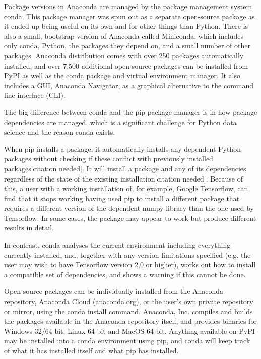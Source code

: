 \documentclass[oneside,a4paper,12pt]{report}
\begin{document}
Package versions in Anaconda are managed by the package management system conda. This package manager was spun out as a separate open-source package as it ended up being useful on its own and for other things than Python. There is also a small, bootstrap version of Anaconda called Miniconda, which includes only conda, Python, the packages they depend on, and a small number of other packages.
Anaconda distribution comes with over 250 packages automatically installed, and over 7,500 additional open-source packages can be installed from PyPI as well as the conda package and virtual environment manager. It also includes a GUI, Anaconda Navigator, as a graphical alternative to the command line interface (CLI).

The big difference between conda and the pip package manager is in how package dependencies are managed, which is a significant challenge for Python data science and the reason conda exists.

When pip installs a package, it automatically installs any dependent Python packages without checking if these conflict with previously installed packages[citation needed]. It will install a package and any of its dependencies regardless of the state of the existing installation[citation needed]. Because of this, a user with a working installation of, for example, Google Tensorflow, can find that it stops working having used pip to install a different package that requires a different version of the dependent numpy library than the one used by Tensorflow. In some cases, the package may appear to work but produce different results in detail.

In contrast, conda analyses the current environment including everything currently installed, and, together with any version limitations specified (e.g. the user may wish to have Tensorflow version 2,0 or higher), works out how to install a compatible set of dependencies, and shows a warning if this cannot be done.

Open source packages can be individually installed from the Anaconda repository, Anaconda Cloud (anaconda.org), or the user's own private repository or mirror, using the conda install command. Anaconda, Inc. compiles and builds the packages available in the Anaconda repository itself, and provides binaries for Windows 32/64 bit, Linux 64 bit and MacOS 64-bit. Anything available on PyPI may be installed into a conda environment using pip, and conda will keep track of what it has installed itself and what pip has installed.
\end{document}

